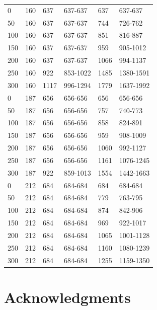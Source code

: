 \begin{table}[H]
{\begin{tabular}{@{\extracolsep{2 pt}}llllll@{}}
			\hline
			0 & 160 & 637 & 637-637 & 637 & 637-637 \\ 
			50 & 160 & 637 & 637-637 & 744 & 726-762 \\ 
			100 & 160 & 637 & 637-637 & 851 & 816-887 \\ 
			150 & 160 & 637 & 637-637 & 959 & 905-1012 \\ 
			200 & 160 & 637 & 637-637 & 1066 & 994-1137 \\ 
			250 & 160 & 922 & 853-1022 & 1485 & 1380-1591 \\ 
			300 & 160 & 1117 & 996-1294 & 1779 & 1637-1992 \\ 
			\hline
			0 & 187 & 656 & 656-656 & 656 & 656-656 \\ 
			50 & 187 & 656 & 656-656 & 757 & 740-773 \\ 
			100 & 187 & 656 & 656-656 & 858 & 824-891 \\ 
			150 & 187 & 656 & 656-656 & 959 & 908-1009 \\ 
			200 & 187 & 656 & 656-656 & 1060 & 992-1127 \\ 
			250 & 187 & 656 & 656-656 & 1161 & 1076-1245 \\ 
			300 & 187 & 922 & 859-1013 & 1554 & 1442-1663 \\ 
			\hline
			0 & 212 & 684 & 684-684 & 684 & 684-684 \\ 
			50 & 212 & 684 & 684-684 & 779 & 763-795 \\ 
			100 & 212 & 684 & 684-684 & 874 & 842-906 \\ 
			150 & 212 & 684 & 684-684 & 969 & 922-1017 \\ 
			200 & 212 & 684 & 684-684 & 1065 & 1001-1128 \\ 
			250 & 212 & 684 & 684-684 & 1160 & 1080-1239 \\ 
			300 & 212 & 684 & 684-684 & 1255 & 1159-1350 \\ 
			\hline
			
		\end{tabular}
	}
	\label{ap_b_p_sim_m_with_tds_0}
\end{table}


\clearpage



\section{Acknowledgments}

